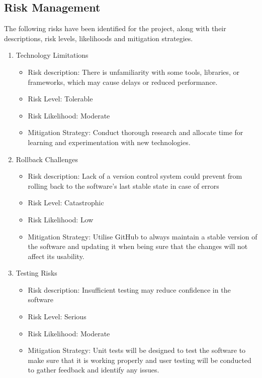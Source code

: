 \documentclass[12pt]{article}
\begin{document}
    \subsection{Risk Management}
    The following risks have been identified for the project, along with their descriptions, risk levels, likelihoods and mitigation strategies.
        \begin{enumerate}
             
       
        \item{Technology Limitations}
        \begin{itemize}
            \item Risk description: There is unfamiliarity with some tools, libraries, or frameworks, which may cause delays or reduced performance. 
            \item Risk Level: Tolerable
            \item Risk Likelihood: Moderate
            \item Mitigation Strategy: Conduct thorough research and allocate time for learning and experimentation with new technologies.
        \end{itemize}

        \item{Rollback Challenges}
        \begin{itemize}
            \item Risk description: Lack of a version control system could prevent from rolling back to the software's last stable state in case of errors
            \item Risk Level: Catastrophic
            \item Risk Likelihood: Low
            \item Mitigation Strategy: Utilise GitHub to always maintain a stable version of the software and updating it when being sure that the changes will not affect its usability. 
        \end{itemize}

        \item{Testing Risks}
        \begin{itemize}
            \item Risk description: Insufficient testing may reduce confidence in the software
            \item Risk Level: Serious
            \item Risk Likelihood: Moderate
            \item Mitigation Strategy: Unit tests will be designed to test the software to make sure that it is working properly and user testing will be conducted to gather feedback and identify any issues.
        \end{itemize}


\end{enumerate}
\end{document}
